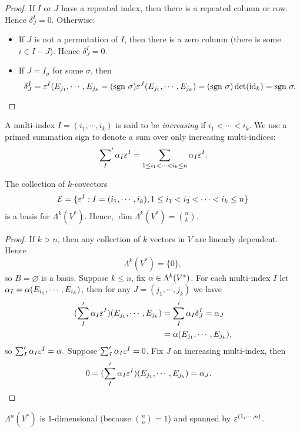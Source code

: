\begin{proof}
    If $I$ or $J$ have a repeated index, then there is a repeated column or row. Hence $\delta_J^I = 0$. Otherwise:
    \begin{itemize}
    \item If $J$ is not a permutation of $I$, then there is a zero column (there is some $i \in I-J$). Hence $\delta_J^I = 0$.
    \item If $J = I_\sigma$ for some $\sigma$, then $$\delta_J^I = \varepsilon^I(E_{j_1},\cdots,E_{j_k} = (\mathrm{sgn~} \sigma) \varepsilon^J (E_{j_1}, \cdots, E_{j_k}) = (\mathrm{sgn~} \sigma)\det (\mathrm{id}_k) = \mathrm{sgn~} \sigma.$$
    \end{itemize}
\end{proof}
 A multi-index $I=(i_1,\cdots,i_k)$ is said to be \textit{increasing} if $i_1 < \cdots < i_k$. We use a primed summation sign to denote a sum over only increasing multi-indices:
$$\sideset{}{'}\sum_{I} \alpha_I \varepsilon^I = \sum_{1 \leq i_1<\cdots<i_k \leq n} \alpha_I \varepsilon^I.$$
\begin{proposition}\label{14.8} 
    The collection of $k$-covectors
    $$ \mathcal{E} = \{\varepsilon^I: I = (i_1,\cdots,i_k), 1 \leq i_1<i_2<\cdots<i_k \leq n \}$$ is a basis for $\Lambda^k(V^*)$. Hence, $\dim \Lambda^k(V^*) = \binom{n}{k}$.
\end{proposition}
\begin{proof} 
     If $k>n$, then any collection of $k$ vectors in $V$ are linearly dependent. Hence 
    $$\Lambda^k(V^*) = \{0\},$$ so $B = \varnothing$ is a basis. Suppose $k \leq n$, fix $\alpha \in \Lambda^k(V^*)$. For each multi-index $I$ let $\alpha_I = \alpha(E_{i_1},\cdots,E_{i_k})$, then for any $J = (j_1,\cdots,j_k)$ we have 
    \begin{align*}
    (\sum_I'\alpha_I \varepsilon^I)(E_{j_1},\cdots,E_{j_k})
    &= \sum_I'\alpha_I \delta_J^I = \alpha_J \\
    &= \alpha(E_{j_1},\cdots,E_{j_k}),
    \end{align*}
    so $\sum_I'\alpha_I \varepsilon^I = \alpha. $
    Suppose $\sum_I'\alpha_I\varepsilon^I = 0$. Fix $J$ an increasing multi-index, then 
    \begin{align*}
    0 &= (\sum_I'\alpha_I\varepsilon^I)(E_{j_1},\cdots,E_{j_k}) = \alpha_J. 
    \end{align*}
\end{proof}
\begin{example}
    $\Lambda^n(V^*)$ is $1$-dimensional (because $\binom{n}{n}=1$) and spanned by $\varepsilon^{(1,\cdots,n)}$. 
\end{example}
